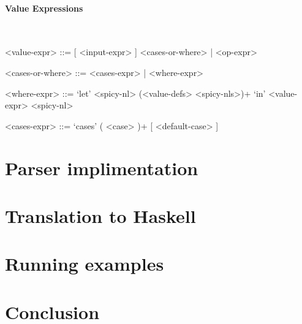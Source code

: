 \documentclass{article}
\def\H{Haskell}
\begin{document}
\paragraph{Value Expressions}

\hspace{1cm}\\
\begin{grammar}

<value-expr> ::= [ <input-expr> ] <cases-or-where> | <op-expr>

<cases-or-where> ::= <cases-expr> | <where-expr>

<where-expr> ::=
`let' <spicy-nl> (<value-defs> <spicy-nls>)+ `in' <value-expr> <spicy-nl>

<cases-expr> ::= `cases' ( <case> )+ [ <default-case> ]

\end{grammar}

\section{Parser implimentation}
\section{Translation to \H}
\section{Running examples}
\section{Conclusion}

\hspace{1cm}\\

%
%
%
%

\end{document}
